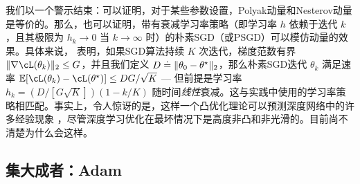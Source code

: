 \documentclass[../../book-main_zh.tex]{subfiles}
\begin{document}
我们以一个警示结束：可以证明，对于某些参数设置，Polyak动量和Nesterov动量是等价的。那么，也可以证明，带有衰减学习率策略（即学习率 \(h\) 依赖于迭代 \(k\)，且其极限为 \(h_{k} \to 0\) 当 \(k \to \infty\) 时）的朴素SGD（或PSGD）可以模仿动量的效果。具体来说，\cite{defazio2023optimal} 表明，如果SGD算法持续 \(K\) 次迭代，梯度范数有界 \(\norm{\nabla \cL(\theta_{k})}_{2} \leq G\)，并且我们定义 \(D \doteq \norm{\theta_{0} - \theta^{\star}}_{2}\)，那么朴素SGD迭代 \(\theta_{k}\) 满足速率 \(\Ex[\cL(\theta_{k}) - \cL(\theta^{\star})] \leq DG/\sqrt{K}\) --- 但前提是学习率 \(h_{k} = (D/[G\sqrt{K}])(1 - k/K)\) 随时间\textit{线性}衰减。这与实践中使用的学习率策略相匹配。事实上，令人惊讶的是，这样一个凸优化理论可以预测深度网络中的许多经验现象 \cite{schaipp2025surprising}，尽管深度学习优化在最坏情况下是高度非凸和非光滑的。目前尚不清楚为什么会这样。


\subsection{集大成者：Adam}
\end{document}
